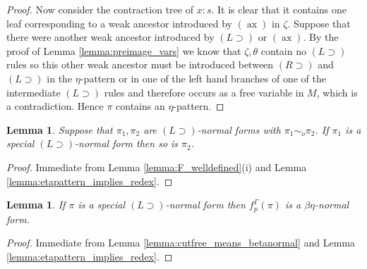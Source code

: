 \documentclass[english,letter paper,12pt,leqno]{article}
\newtheorem{lemma}[theorem]{Lemma}
\theoremstyle{example}
\numberwithin{equation}{section}
\def\imp{\supset}
\begin{document}
\begin{proof}
Now consider the contraction tree of $x:s$. It is clear that it contains one leaf corresponding to a weak ancestor introduced by $(\operatorname{ax})$ in $\zeta$. Suppose that there were another weak ancestor introduced by $(L \imp)$ or $(\operatorname{ax})$. By the proof of Lemma \ref{lemma:preimage_vars} we know that $\zeta, \theta$ contain no $(L \imp)$ rules so this other weak ancestor must be introduced between $(R \imp)$ and $(L \imp)$ in the $\eta$-pattern or in one of the left hand branches of one of the intermediate $(L \imp)$ rules and therefore occurs as a free variable in $M$, which is a contradiction. Hence $\pi$ contains an $\eta$-pattern.
\end{proof}

\begin{lemma}\label{lemma:simo_specialnormal} Suppose that $\pi_1,\pi_2$ are $(L \imp)$-normal forms with $\pi_1 \sim_o \pi_2$. If $\pi_1$ is a special $(L \imp)$-normal form then so is $\pi_2$.
\end{lemma}
\begin{proof}
Immediate from Lemma \ref{lemma:F_welldefined}(i) and Lemma \ref{lemma:etapattern_implies_redex}.
\end{proof}

\begin{lemma}\label{lemma:special_means_betaetanormal} If $\pi$ is a special $(L \imp)$-normal form then $f^\Gamma_p(\pi)$ is a $\beta\eta$-normal form.
\end{lemma}
\begin{proof}
Immediate from Lemma \ref{lemma:cutfree_means_betanormal} and Lemma \ref{lemma:etapattern_implies_redex}.
\end{proof}
\end{document}
